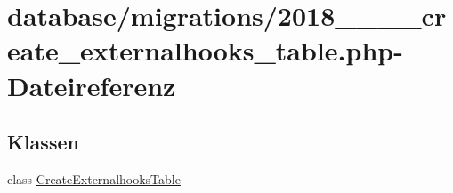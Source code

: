 \hypertarget{2018__06__12__162233__create__externalhooks__table_8php}{}\section{database/migrations/2018\+\_\+\_\+\_\+\_\+create\+\_\+externalhooks\+\_\+table.php-\/\+Dateireferenz}
\label{2018__06__12__162233__create__externalhooks__table_8php}
\subsection*{Klassen}
\begin{DoxyCompactItemize}
\item 
class \hyperlink{classCreateExternalhooksTable}{Create\+Externalhooks\+Table}
\end{DoxyCompactItemize}
